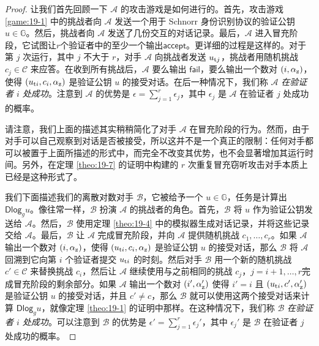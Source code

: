 \begin{proof}
让我们首先回顾一下 $\mathcal{A}$ 的攻击游戏是如何进行的。首先，攻击游戏 \ref{game:19-1} 中的挑战者向 $\mathcal{A}$ 发送一个用于 Schnorr 身份识别协议的验证公钥 $u\in\mathbb{G}$。然后，挑战者向 $\mathcal{A}$ 发送了几份交互的对话记录。最后，$\mathcal{A}$ 进入冒充阶段，它试图让$r$个验证者中的至少一个输出$\mathsf{accept}$。更详细的过程是这样的。对于第 $j$ 次运行，其中 $j$ 不大于 $r$，对手 $\mathcal{A}$ 向挑战者发送 $u_{{\rm t}j}$，挑战者用随机挑战 $c_j\in\mathcal{C}$ 来应答。在收到所有挑战后，$\mathcal{A}$ 要么输出 $\mathsf{fail}$，要么输出一个数对 $(i,\alpha_{\rm z})$，使得 $(u_{{\rm t}i},c_i,\alpha_{\rm z})$ 是验证公钥 $u$ 的接受对话。在后一种情况下，我们称 $\mathcal{A}$ \emph{在验证者 $i$ 处成功}。注意到 $\mathcal{A}$ 的优势是 $\epsilon=\sum_{j=1}^r\epsilon_j$，其中 $\epsilon_j$ 是 $\mathcal{A}$ 在验证者 $j$ 处成功的概率。

请注意，我们上面的描述其实稍稍简化了对手 $\mathcal{A}$ 在冒充阶段的行为。然而，由于对手可以自己观察到对话是否被接受，所以这并不是一个真正的限制：任何对手都可以被置于上面所描述的形式中，而完全不改变其优势，也不会显著增加其运行时间。另外，在定理 \ref{theo:19-7} 的证明中构建的 $r$ 次重复冒充窃听攻击对手本质上已经是这种形式了。

我们下面描述我们的离散对数对手 $\mathcal{B}$，它被给予一个 $u\in\mathbb{G}$，任务是计算出 $\mathsf{Dlog}_gu$。像往常一样，$\mathcal{B}$ 扮演 $\mathcal{A}$ 的挑战者的角色。首先，$\mathcal{B}$ 将 $u$ 作为验证公钥发送给 $\mathcal{A}$。然后，$\mathcal{B}$ 使用定理 \ref{theo:19-4} 中的模拟器生成对话记录，并将这些记录交给 $\mathcal{A}$。最后，$\mathcal{B}$ 让 $\mathcal{A}$ 完成冒充阶段，并向 $\mathcal{A}$ 提供随机挑战 $c_1,\dots,c_r$。如果 $\mathcal{A}$ 输出一个数对 $(i,\alpha_{\rm z})$，使得 $(u_{{\rm t}i},c_i,\alpha_{\rm z})$ 是验证公钥 $u$ 的接受对话，那么 $\mathcal{B}$ 将 $\mathcal{A}$ 回溯到它向第 $i$ 个验证者提交 $u_{{\rm t}i}$ 的时刻。然后对手 $\mathcal{B}$ 用一个新的随机挑战 $c'\in\mathcal{C}$ 来替换挑战 $c_i$，然后让 $\mathcal{A}$ 继续使用与之前相同的挑战 $c_j$，$j=i+1,\dots,r$完成冒充阶段的剩余部分。如果 $\mathcal{A}$ 输出一个数对 $(i',\alpha_{\rm z}')$ 使得 $i'=i$ 且 $(u_{{\rm t}i},c',\alpha_{\rm z}')$ 是验证公钥 $u$ 的接受对话，并且 $c'\neq c$，那么 $\mathcal{B}$ 就可以使用这两个接受对话来计算 $\mathsf{Dlog}_gu$，就像定理 \ref{theo:19-1} 的证明中那样。在这种情况下，我们称 $\mathcal{B}$ \emph{在验证者 $i$ 处成功}。可以注意到 $\mathcal{B}$ 的优势是 $\epsilon'=\sum_{j=1}^r\epsilon_j'$，其中 $\epsilon_j'$ 是 $\mathcal{B}$ 在验证者 $j$ 处成功的概率。


\end{proof}
